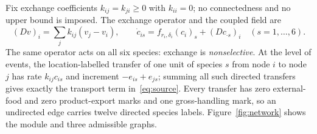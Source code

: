 \documentclass[11pt,a4paper]{article}
\theoremstyle{plain}
\theoremstyle{definition}
\theoremstyle{remark}
\newcommand{\Dop}{D}
\begin{document}
Fix exchange coefficients $k_{ij}=k_{ji}\ge0$ with $k_{ii}=0$; no connectedness and no upper bound is imposed. The exchange operator and the coupled field are
\begin{equation}\label{eq:source}
(\Dop v)_i=\sum_{j}k_{ij}(v_j-v_i),\qquad
\dot c_{is}=f_{r_i,\delta_i}(c_i)_s+(\Dop c_{\cdot s})_i\quad(s=1,\dots,6).
\end{equation}
The same operator acts on all six species: exchange is \emph{nonselective}. At the level of events, the location-labelled transfer of one unit of species $s$ from node $i$ to node $j$ has rate $k_{ij}c_{is}$ and increment $-e_{is}+e_{js}$; summing all such directed transfers gives exactly the transport term in~\eqref{eq:source}. Every transfer has zero external-food and zero product-export marks and one gross-handling mark, so an undirected edge carries twelve directed species labels. Figure~\ref{fig:network} shows the module and three admissible graphs.
\end{document}
